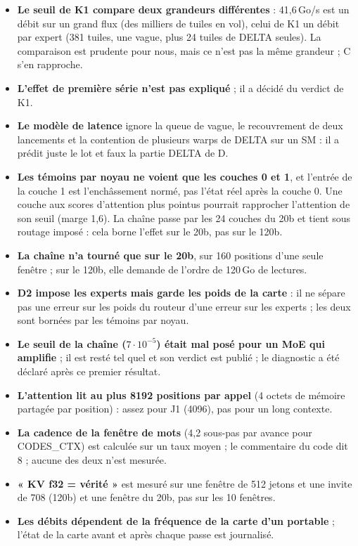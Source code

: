 \begin{faux}
\begin{itemize}
\item \textbf{Le seuil de K1 compare deux grandeurs différentes} : 41,6\,Go/s est un débit sur un grand flux (des milliers de tuiles en vol), celui de K1 un débit par expert (381 tuiles, une vague, plus 24 tuiles de DELTA seules). La comparaison est prudente pour nous, mais ce n'est pas la même grandeur ; C s'en rapproche.
\item \textbf{L'effet de première série n'est pas expliqué} ; il a décidé du verdict de K1.
\item \textbf{Le modèle de latence} ignore la queue de vague, le recouvrement de deux lancements et la contention de plusieurs warps de DELTA sur un SM : il a prédit juste le lot et faux la partie DELTA de D.
\item \textbf{Les témoins par noyau ne voient que les couches 0 et 1}, et l'entrée de la couche 1 est l'enchâssement normé, pas l'état réel après la couche 0. Une couche aux scores d'attention plus pointus pourrait rapprocher l'attention de son seuil (marge 1,6). La chaîne passe par les 24 couches du 20b et tient sous routage imposé : cela borne l'effet sur le 20b, pas sur le 120b.
\item \textbf{La chaîne n'a tourné que sur le 20b}, sur 160 positions d'une seule fenêtre ; sur le 120b, elle demande de l'ordre de 120\,Go de lectures.
\item \textbf{D2 impose les experts mais garde les poids de la carte} : il ne sépare pas une erreur sur les poids du routeur d'une erreur sur les experts ; les deux sont bornées par les témoins par noyau.
\item \textbf{Le seuil de la chaîne ($7\cdot10^{-5}$) était mal posé pour un MoE qui amplifie} ; il est resté tel quel et son verdict est publié ; le diagnostic a été déclaré après ce premier résultat.
\item \textbf{L'attention lit au plus \num{8192} positions par appel} (4 octets de mémoire partagée par position) : assez pour J1 (\num{4096}), pas pour un long contexte.
\item \textbf{La cadence de la fenêtre de mots} (4,2 sous-pas par avance pour CODES\_CTX) est calculée sur un taux moyen ; le commentaire du code dit 8 ; aucune des deux n'est mesurée.
\item \textbf{« KV f32 = vérité »} est mesuré sur une fenêtre de 512 jetons et une invite de 708 (120b) et une fenêtre du 20b, pas sur les 10 fenêtres.
\item \textbf{Les débits dépendent de la fréquence de la carte d'un portable} ; l'état de la carte avant et après chaque passe est journalisé.
\end{itemize}
\end{faux}


